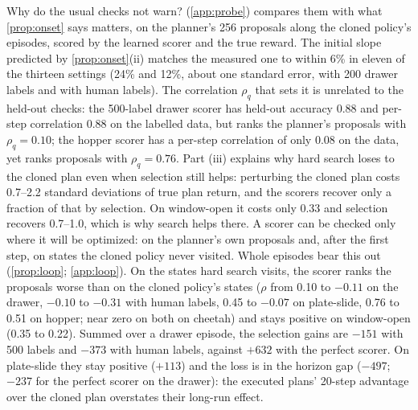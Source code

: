 \documentclass{article}
\theoremstyle{plain}
\theoremstyle{remark}
\begin{document}
Why do the usual checks not warn?  (\cref{app:probe}) compares them with what \cref{prop:onset} says
matters, on the planner's 256 proposals along the cloned policy's episodes, scored by the learned scorer and the true
reward. The initial slope predicted by \cref{prop:onset}(ii) matches the measured one to within 6\% in eleven of the
thirteen settings (24\% and 12\%, about one standard error, with 200 drawer labels and with human labels). The correlation
$\rho_q$ that sets it is unrelated to the held-out checks: the 500-label drawer scorer has held-out accuracy 0.88 and
per-step correlation 0.88 on the labelled data, but ranks the planner's proposals with $\rho_q=0.10$; the hopper scorer
has a per-step correlation of only 0.08 on the data, yet ranks proposals with $\rho_q=0.76$. Part (iii) explains why hard
search loses to the cloned plan even when selection still helps: perturbing the cloned plan costs 0.7--2.2 standard
deviations of true plan return, and the scorers recover only a fraction of that by selection. On window-open it costs
only 0.33 and selection recovers 0.7--1.0, which is why search helps there. A scorer can be checked
only where it will be optimized: on the planner's own proposals and, after the first step, on states the cloned policy
never visited. Whole episodes bear this out (\cref{prop:loop}; \cref{app:loop}). On the states hard search visits, the
scorer ranks the proposals worse than on the cloned policy's states ($\rho$ from 0.10 to $-0.11$ on the drawer,
$-0.10$ to $-0.31$ with human labels, 0.45 to $-0.07$ on plate-slide, 0.76 to 0.51 on hopper; near zero on both on
cheetah) and stays positive on window-open (0.35 to 0.22). Summed over a drawer episode, the selection gains are $-151$ with 500
labels and $-373$ with human labels, against $+632$ with the perfect scorer. On plate-slide they stay positive ($+113$)
and the loss is in the horizon gap ($-497$; $-237$ for the perfect scorer on the drawer): the executed plans' 20-step
advantage over the cloned plan overstates their long-run effect.
\end{document}
